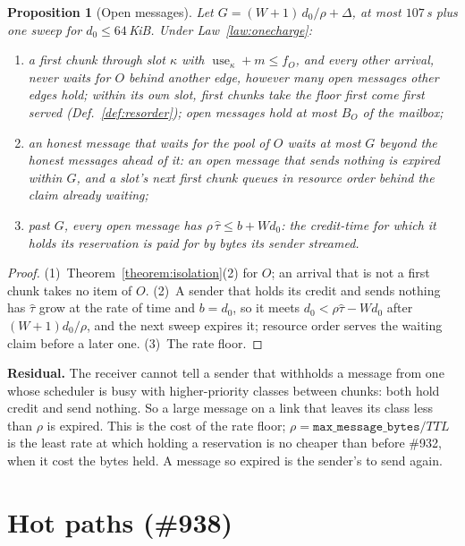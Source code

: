 \documentclass[journal]{IEEEtran}
\newtheorem{proposition}{Proposition}
\newcommand{\use}{\operatorname{use}}
\newcommand{\issue}[1]{\#{#1}}
\begin{document}
\begin{proposition}[Open messages]\label{prop:open}
Let $G=(W+1)\,d_0/\rho+\Delta$, at most $107$\,s plus one sweep for $d_0\le64$\,KiB.  Under
Law~\ref{law:onecharge}:
\begin{enumerate}[leftmargin=1.5em]
\item a first chunk through slot $\kappa$ with $\use_\kappa+m\le f_O$, and every other arrival,
never waits for $O$ behind another edge, however many open messages other edges hold; within
its own slot, first chunks take the floor first come first served
(Def.~\ref{def:resorder}); open messages hold at most $B_O$ of the mailbox;
\item an honest message that waits for the pool of $O$ waits at most $G$ beyond the honest
messages ahead of it: an open message that sends nothing is expired within $G$, and a slot's
next first chunk queues in resource order behind the claim already waiting;
\item past $G$, every open message has $\rho\,\hat\tau\le b+W d_0$: the credit-time for which it
holds its reservation is paid for by bytes its sender streamed.
\end{enumerate}
\end{proposition}
\begin{proof}
(1)~Theorem~\ref{theorem:isolation}(2) for $O$; an arrival that is not a first chunk takes no
item of $O$.  (2)~A sender that holds its credit and sends nothing has $\hat\tau$ grow at the
rate of time and $b=d_0$, so it meets $d_0<\rho\hat\tau-Wd_0$ after $(W+1)d_0/\rho$, and the next
sweep expires it; resource order serves the waiting claim before a later one.
(3)~The rate floor.
\end{proof}

\textbf{Residual.}  The receiver cannot tell a sender that withholds a message from one whose
scheduler is busy with higher-priority classes between chunks: both hold credit and send
nothing.  So a large message on a link that leaves its class less than $\rho$ is expired.  This
is the cost of the rate floor; $\rho=\texttt{max\_message\_bytes}/\mathit{TTL}$ is the least
rate at which holding a reservation is no cheaper than before \issue{932}, when it cost the
bytes held.  A message so expired is the sender's to send again.

\section{Hot paths (\issue{938})}\label{sec:hot}
\end{document}
